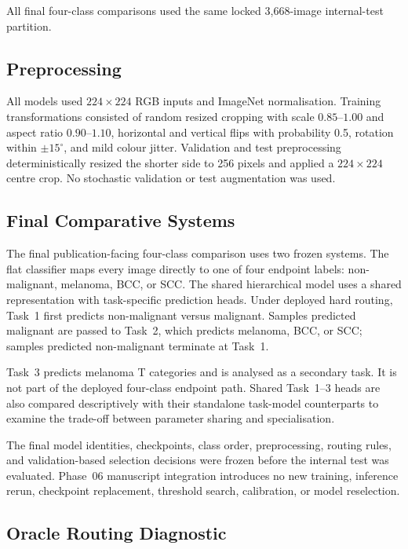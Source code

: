 All final four-class comparisons used the same locked 3,668-image internal-test
partition.

\subsection{Preprocessing}

All models used $224\times224$ RGB inputs and ImageNet normalisation.
Training transformations consisted of random resized cropping with scale
$0.85$--$1.00$ and aspect ratio $0.90$--$1.10$, horizontal and vertical
flips with probability 0.5, rotation within $\pm15^{\circ}$, and mild colour
jitter. Validation and test preprocessing deterministically resized the
shorter side to 256 pixels and applied a $224\times224$ centre crop. No
stochastic validation or test augmentation was used.

\subsection{Final Comparative Systems}

The final publication-facing four-class comparison uses two frozen systems.
The flat classifier maps every image directly to one of four endpoint labels:
non-malignant, melanoma, BCC, or SCC. The shared hierarchical model uses a
shared representation with task-specific prediction heads. Under deployed
hard routing, Task~1 first predicts non-malignant versus malignant. Samples
predicted malignant are passed to Task~2, which predicts melanoma, BCC, or
SCC; samples predicted non-malignant terminate at Task~1.

Task~3 predicts melanoma T categories and is analysed as a secondary task.
It is not part of the deployed four-class endpoint path. Shared Task~1--3
heads are also compared descriptively with their standalone task-model
counterparts to examine the trade-off between parameter sharing and
specialisation.

The final model identities, checkpoints, class order, preprocessing, routing
rules, and validation-based selection decisions were frozen before the
internal test was evaluated. Phase~06 manuscript integration introduces no
new training, inference rerun, checkpoint replacement, threshold search,
calibration, or model reselection.

\subsection{Oracle Routing Diagnostic}


